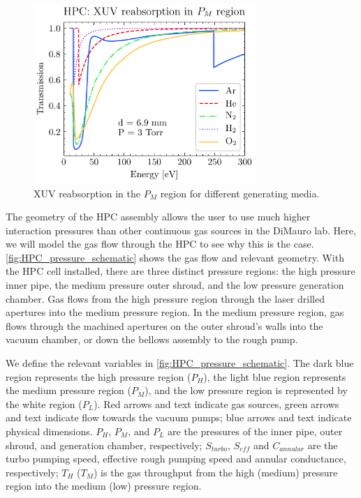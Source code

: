 \begin{figure}
	\centering
	\includegraphics[width=0.75\textwidth]{figures/chap3/HPC_absorption.pdf}
	\caption{XUV reabsorption in the $P_M$ region for different generating media.}
	\label{fig:HPC_absorption}
\end{figure}

The geometry of the HPC assembly allows the user to use much higher interaction pressures than other continuous gas sources in the DiMauro lab. Here, we will model the gas flow through the HPC to see why this is the case. \cref{fig:HPC_pressure_schematic} shows the gas flow and relevant geometry. With the HPC cell installed, there are three distinct pressure regions: the high pressure inner pipe, the medium pressure outer shroud, and the low pressure generation chamber. Gas flows from the high pressure region through the laser drilled apertures into the medium pressure region. In the medium pressure region, gas flows through the machined apertures on the outer shroud's walls into the vacuum chamber, or down the bellows assembly to the rough pump.

We define the relevant variables in \cref{fig:HPC_pressure_schematic}. The dark blue region represents the high pressure region ($P_H$), the light blue region represents the medium pressure region ($P_M$), and the low pressure region is represented by the white region ($P_L$). Red arrows and text indicate gas sources, green arrows and text indicate flow towards the vacuum pumps; blue arrows and text indicate physical dimensions. $P_H$, $P_M$, and $P_L$ are the pressures of the inner pipe, outer shroud, and generation chamber, respectively; $S_{turbo}$, $S_{eff}$ and $C_{annular}$ are the turbo pumping speed, effective rough pumping speed and annular conductance, respectively; $T_H$ ($T_M$) is the gas throughput from the high (medium) pressure region into the medium (low) pressure region.

